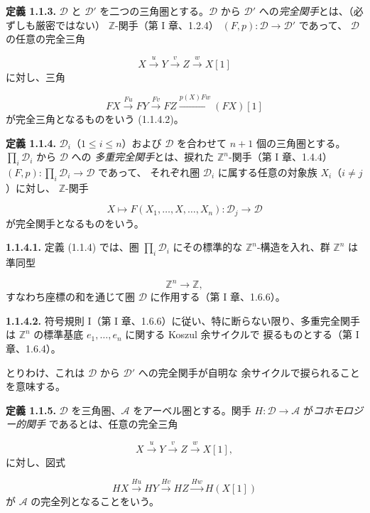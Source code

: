 \clearpage
{}%
\begingroup
\small
\setlength{\abovedisplayskip}{4pt plus 2pt minus 2pt}%
\setlength{\belowdisplayskip}{4pt plus 2pt minus 2pt}%

\noindent\textbf{定義 1.1.3.}\quad
$\mathcal D$ と $\mathcal D'$ を二つの三角圏とする。$\mathcal D$ から
$\mathcal D'$ への\emph{完全関手}とは、（必ずしも厳密ではない）
$\mathbb Z$-関手（第 I 章、1.2.4）
$(F,p)\colon\mathcal D\longrightarrow\mathcal D'$ であって、
$\mathcal D$ の任意の完全三角

\[
  X\xrightarrow{u}Y\xrightarrow{v}Z\xrightarrow{w}X[1]
\]
に対し、三角

\[
  FX\xrightarrow{Fu}FY\xrightarrow{Fv}FZ
  \xrightarrow{p(X)Fw}(FX)[1]
\]
が完全三角となるものをいう (1.1.4.2)。

\medskip
\noindent\textbf{定義 1.1.4.}\quad
$\mathcal D_i$（$1\leq i\leq n$）および $\mathcal D$ を合わせて
$n+1$ 個の三角圏とする。$\prod_i\mathcal D_i$ から $\mathcal D$ への
\emph{多重完全関手}とは、捩れた $\mathbb Z^n$-関手（第 I 章、1.4.4）
$(F,p)\colon\prod_i\mathcal D_i\longrightarrow\mathcal D$ であって、
それぞれ圏 $\mathcal D_i$ に属する任意の対象族 $X_i$（$i\ne j$）に対し、
$\mathbb Z$-関手

\[
  X\longmapsto F(X_1,\ldots,X,\ldots,X_n)\colon
  \mathcal D_j\longrightarrow\mathcal D
\]
が完全関手となるものをいう。

\medskip
\noindent\textbf{1.1.4.1.}\quad
定義 (1.1.4) では、圏 $\prod_i\mathcal D_i$ にその標準的な
$\mathbb Z^n$-構造を入れ、群 $\mathbb Z^n$ は準同型

\[
  \mathbb Z^n\longrightarrow\mathbb Z,
\]
すなわち座標の和を通じて圏 $\mathcal D$ に作用する（第 I 章、1.6.6）。

\medskip
\noindent\textbf{1.1.4.2.}\quad
符号規則 I（第 I 章、1.6.6）に従い、特に断らない限り、多重完全関手は
$\mathbb Z^n$ の標準基底 $e_1,\ldots,e_n$ に関する Koszul 余サイクルで
捩るものとする（第 I 章、1.6.4）。

とりわけ、これは $\mathcal D$ から $\mathcal D'$ への完全関手が自明な
余サイクルで捩られることを意味する。

\medskip
\noindent\textbf{定義 1.1.5.}\quad
$\mathcal D$ を三角圏、$\mathcal A$ をアーベル圏とする。関手
$H\colon\mathcal D\longrightarrow\mathcal A$ が\emph{コホモロジー的関手}
であるとは、任意の完全三角

\[
  X\xrightarrow{u}Y\xrightarrow{v}Z\xrightarrow{w}X[1],
\]
に対し、図式

\[
  HX\xrightarrow{Hu}HY\xrightarrow{Hv}HZ\xrightarrow{Hw}H(X[1])
\]
が $\mathcal A$ の完全列となることをいう。
\endgroup
